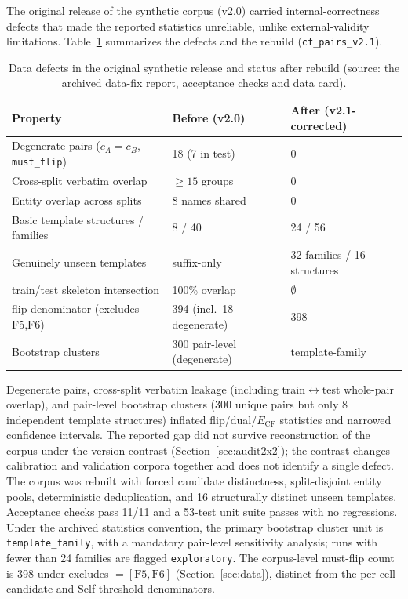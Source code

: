 \documentclass[11pt,a4paper]{article}
\begin{document}
The original release of the synthetic corpus (v2.0) carried
internal-correctness defects that made the reported statistics unreliable,
unlike external-validity limitations. Table~\ref{tab:datafix} summarizes the
defects and the rebuild (\texttt{cf\_pairs\_v2.1}).

\begin{table}[t]
\centering
\caption{Data defects in the original synthetic release and status after
rebuild (source: the archived data-fix report, acceptance checks and data
card).}
\label{tab:datafix}
\begin{tabular}{lll}
\toprule
Property & Before (v2.0) & After (v2.1-corrected) \\
\midrule
Degenerate pairs ($c_A{=}c_B$, \texttt{must\_flip}) & 18 (7 in test) & 0 \\
Cross-split verbatim overlap & $\geq15$ groups & 0 \\
Entity overlap across splits & 8 names shared & 0 \\
Basic template structures / families & 8 / 40 & 24 / 56 \\
Genuinely unseen templates & suffix-only & 32 families / 16 structures \\
train/test skeleton intersection & 100\% overlap & $\emptyset$ \\
flip denominator (excludes F5,F6) & 394 (incl.\ 18 degenerate) & 398 \\
Bootstrap clusters & 300 pair-level (degenerate) & template-family \\
\bottomrule
\end{tabular}
\end{table}

Degenerate pairs, cross-split verbatim leakage (including
train$\leftrightarrow$test whole-pair overlap), and pair-level bootstrap
clusters (300 unique pairs but only 8 independent template structures) inflated
flip/dual/$E_{\mathrm{CF}}$ statistics and narrowed confidence intervals. The
reported gap did not survive reconstruction of the corpus under the version
contrast (Section~\ref{sec:audit2x2}); the contrast changes calibration and
validation corpora together and does not identify a single defect. The corpus
was rebuilt with forced candidate distinctness, split-disjoint entity pools,
deterministic deduplication, and 16 structurally distinct unseen templates.
Acceptance checks pass 11/11 and a 53-test unit suite passes with no
regressions. Under the archived statistics convention, the primary bootstrap
cluster unit is \texttt{template\_family}, with a mandatory pair-level
sensitivity analysis; runs with fewer than 24 families are flagged
\texttt{exploratory}. The corpus-level must-flip count is $398$ under
excludes $=[\mathrm{F5},\mathrm{F6}]$ (Section~\ref{sec:data}), distinct from
the per-cell candidate and Self-threshold denominators.
\end{document}
